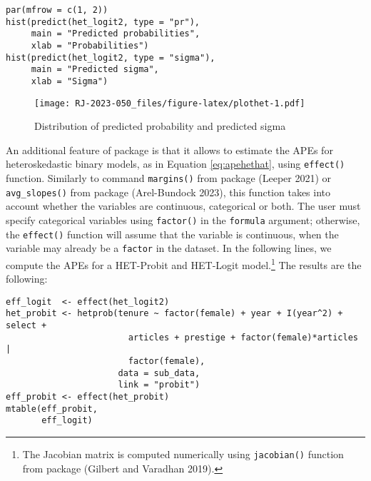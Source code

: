 \begin{verbatim}
par(mfrow = c(1, 2))
hist(predict(het_logit2, type = "pr"), 
     main = "Predicted probabilities", 
     xlab = "Probabilities")
hist(predict(het_logit2, type = "sigma"), 
     main = "Predicted sigma", 
     xlab = "Sigma")
\end{verbatim}

\begin{figure}
\centering
\texttt{[image: RJ-2023-050\_files/figure-latex/plothet-1.pdf]}
\caption{\label{fig:plothet}Distribution of predicted probability and predicted sigma}
\end{figure}

An additional feature of  package is that it allows to estimate the APEs for heteroskedastic binary models, as in Equation \eqref{eq:apehethat}, using \texttt{effect()} function. Similarly to command \texttt{margins()} from  package (Leeper 2021) or \texttt{avg\_slopes()} from  package (Arel-Bundock 2023), this function takes into account whether the variables are continuous, categorical or both. The user must specify categorical variables using \texttt{factor()} in the \texttt{formula} argument; otherwise, the \texttt{effect()} function will assume that the variable is continuous, when the variable may already be a \texttt{factor} in the dataset. In the following lines, we compute the APEs for a HET-Probit and HET-Logit model.\footnote{The Jacobian matrix is computed numerically using \texttt{jacobian()} function from  package (Gilbert and Varadhan 2019).} The results are the following:

\begin{verbatim}
eff_logit  <- effect(het_logit2)
het_probit <- hetprob(tenure ~ factor(female) + year + I(year^2) + select +  
                        articles + prestige + factor(female)*articles | 
                        factor(female),              
                      data = sub_data,                        
                      link = "probit")
eff_probit <- effect(het_probit)
mtable(eff_probit,
       eff_logit)
\end{verbatim}

